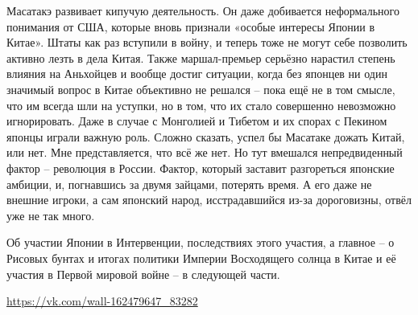 Масатакэ развивает кипучую деятельность. Он даже добивается неформального понимания от США, которые вновь признали «особые интересы Японии в Китае». Штаты как раз вступили в войну, и теперь тоже не могут себе позволить активно лезть в дела Китая. Также маршал-премьер серьёзно нарастил степень влияния на Аньхойцев и вообще достиг ситуации, когда без японцев ни один значимый вопрос в Китае объективно не решался – пока ещё не в том смысле, что им всегда шли на уступки, но в том, что их стало совершенно невозможно игнорировать. Даже в случае с Монголией и Тибетом и их спорах с Пекином японцы играли важную роль. Сложно сказать, успел бы Масатаке дожать Китай, или нет. Мне представляется, что всё же нет. Но тут вмешался непредвиденный фактор – революция в России. Фактор, который заставит разгореться японские амбиции, и, погнавшись за двумя зайцами, потерять время. А его даже не внешние игроки, а сам японский народ, исстрадавшийся из-за дороговизны, отвёл уже не так много.

Об участии Японии в Интервенции, последствиях этого участия, а главное – о Рисовых бунтах и итогах политики Империи Восходящего солнца в Китае и её участия в Первой мировой войне – в следующей части.

\url{https://vk.com/wall-162479647_83282}